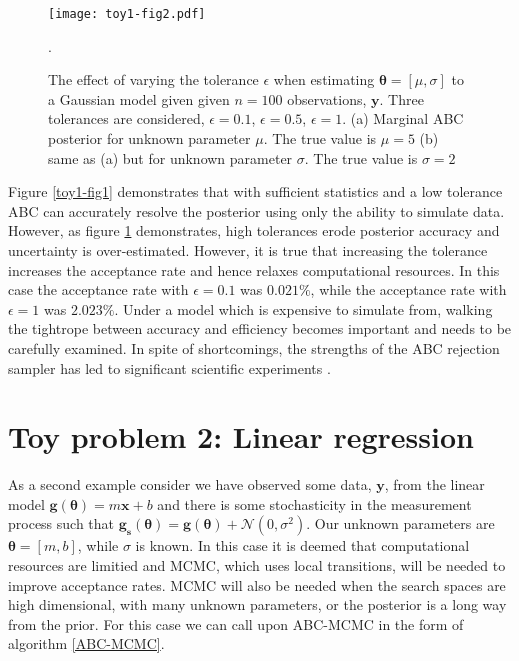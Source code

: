 \begin{figure}[H]
	\centering
	\texttt{[image: toy1-fig2.pdf]}
	\caption{The effect of varying the tolerance $\epsilon$ when estimating $\bm{\theta} = [\mu,\sigma]$ to a Gaussian model given given $n = 100$ observations, $\bm{y}$. Three tolerances are considered, $\epsilon = 0.1$, $\epsilon = 0.5$, $\epsilon = 1$. (a) Marginal ABC posterior for unknown parameter $\mu$. The true value is $\mu = 5$ (b) same as (a) but for unknown parameter $\sigma$. The true value is $\sigma = 2$}.
	\label{toy1-fig2}
\end{figure}

Figure \ref{toy1-fig1} demonstrates that with sufficient statistics and a low tolerance ABC can accurately resolve the posterior using only the ability to simulate data. However, as figure \ref{toy1-fig2} demonstrates, high tolerances erode posterior accuracy and uncertainty is over-estimated. However, it is true that increasing the tolerance increases the acceptance rate and hence relaxes computational resources. In this case the acceptance rate with $\epsilon = 0.1$ was $0.021\%$, while the acceptance rate with $\epsilon = 1$ was $2.023\%$. Under a model which is expensive to simulate from, walking the tightrope between accuracy and efficiency becomes important and needs to be carefully examined. In spite of shortcomings, the strengths of the ABC rejection sampler has led to significant scientific experiments \citep{Fu1997,Weiss1998a,Pritchard1999a}.

\section{Toy problem 2: Linear regression}
\label{sec-lin-reg}

As a second example consider we have observed some data, $\bm{y}$, from the linear model $\bm{g}(\bm{\theta}) = m\bm{x} + b$ and there is some stochasticity in the measurement process such that $\bm{g_s}(\bm{\theta}) = \bm{g}(\bm{\theta}) + \mathcal{N}(0,\sigma^2)$. Our unknown parameters are $\bm{\theta} = [m,b]$, while $\sigma$ is known. In this case it is deemed that computational resources are limitied and MCMC, which uses local transitions, will be needed to improve acceptance rates. MCMC will also be needed when the search spaces are high dimensional, with many unknown parameters, or the posterior is a long way from the prior. For this case we can call upon ABC-MCMC in the form of algorithm \ref{ABC-MCMC}. \\


